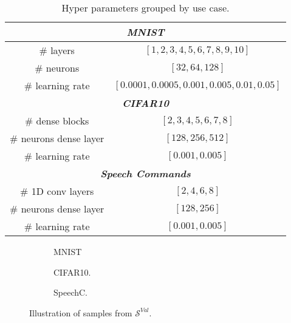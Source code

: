 \begin{table}[!htpb]
\centering
\footnotesize
\caption{Hyper parameters grouped by use case. }
\begin{tabular}{cc} \toprule
\multicolumn{2}{c}{\textit{\textbf{MNIST}}} \\ \midrule
    $\#$ layers &     $[1, 2, 3, 4, 5, 6, 7, 8, 9, 10]$        \\
    $\#$ neurons &     $[32, 64, 128]$        \\
    $\#$ learning rate &     $[0.0001, 0.0005, 0.001, 0.005, 0.01, 0.05]$       \\ \midrule
    \multicolumn{2}{c}{\textit{\textbf{CIFAR10}}} \\ \midrule
    $\#$ dense blocks &     $[2, 3, 4, 5, 6, 7, 8]$        \\
    $\#$ neurons dense layer&     $[128, 256, 512]$        \\
    $\#$ learning rate &     $[0.001, 0.005]$       \\ \midrule
    \multicolumn{2}{c}{\textit{\textbf{Speech Commands}}} \\ \midrule
    $\#$ 1D conv layers &     $[2, 4, 6, 8]$        \\
    $\#$ neurons dense layer &     $[128, 256]$        \\
    $\#$ learning rate &     $[0.001, 0.005]$       \\ \bottomrule
\end{tabular}
\label{tab.hp}
\end{table}

%     

\begin{figure}[b]
  \centering
  \begin{subfigure}{0.215\linewidth}
     \centering
     
     \caption{MNIST}
     \label{subfig:4mnist}
  \end{subfigure}
  \hspace{0.05\linewidth}
  \begin{subfigure}{0.215\linewidth}
     \centering
     
     \caption{CIFAR10.}
     \label{subfig:4cifar}
  \end{subfigure}
  \hspace{0.05\linewidth}
  \begin{subfigure}{0.215\linewidth}
     \centering
     
     \caption{SpeechC.}
     \label{subfig:4sr}
  \end{subfigure}
  \caption{Illustration of samples from $\mathcal{S}^{Val}$.}
  \label{fig:clean_samples}
\end{figure}
 

